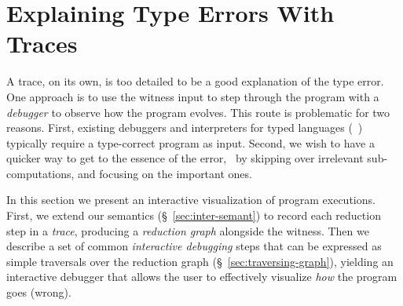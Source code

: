 \section{Explaining Type Errors With Traces}
\label{sec:interactive}

A trace, on its own, is too detailed to be
a good explanation of the type error. One approach
is to use the witness input to step through the
program with a \emph{debugger} to observe how
the program evolves.
%
This route is problematic for two reasons.
%
First, existing debuggers and interpreters for
typed languages (\eg\ \ocaml) typically require
a type-correct program as input.
%
Second, we wish to have a quicker way to get
to the essence of the error, \eg\ by skipping
over irrelevant sub-computations, and focusing
on the important ones.

In this section we present an interactive visualization of program
executions.
%
First, we extend our semantics (\S~\ref{sec:inter-semant}) to record
each reduction step in a \emph{trace}, producing a \emph{reduction
  graph} alongside the witness.
%
Then we describe a set of common \emph{interactive debugging} steps that
can be expressed as simple traversals over the reduction graph
(\S~\ref{sec:traversing-graph}), yielding an interactive debugger that
allows the user to effectively visualize \emph{how} the program goes
(wrong).

